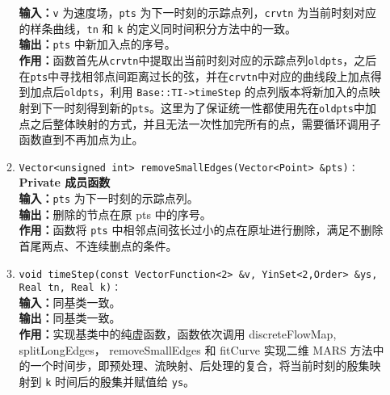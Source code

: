 \documentclass[a4paper,twoside]{ctexart}
\begin{document}
\begin{itemize}
\begin{enumerate}[(1)]
                \textbf{输入：}\texttt{v} 为速度场，\texttt{pts} 为下一时刻的示踪点列，\texttt{crvtn} 为当前时刻对应的样条曲线，\texttt{tn} 和 \texttt{k} 的定义同时间积分方法中的一致。\\
                \textbf{输出：}\texttt{pts} 中新加入点的序号。\\
                \textbf{作用：}函数首先从\texttt{crvtn}中提取出当前时刻对应的示踪点列\texttt{oldpts}，之后在\texttt{pts}中寻找相邻点间距离过长的弦，并在\texttt{crvtn}中对应的曲线段上加点得到加点后\texttt{oldpts}，利用 \texttt{Base::TI->timeStep} 的点列版本将新加入的点映射到下一时刻得到新的\texttt{pts}。这里为了保证统一性都使用先在\texttt{oldpts}中加点之后整体映射的方式，并且无法一次性加完所有的点，需要循环调用子函数直到不再加点为止。
                \item \texttt{Vector<unsigned int> removeSmallEdges(Vector<Point> \&pts)：}\\
                \textbf{Private 成员函数}\\
                \textbf{输入：}\texttt{pts} 为下一时刻的示踪点列。\\
                \textbf{输出：}删除的节点在原 pts 中的序号。\\
                \textbf{作用：}函数将 \texttt{pts} 中相邻点间弦长过小的点在原址进行删除，满足不删除首尾两点、不连续删点的条件。
                \item \texttt{void timeStep(const VectorFunction<2> \&v, YinSet<2,Order> \&ys, Real tn, Real k)：}\\
                \textbf{输入：}同基类一致。\\
                \textbf{输出：}同基类一致。\\
                \textbf{作用：}实现基类中的纯虚函数，函数依次调用 discreteFlowMap, splitLongEdges， removeSmallEdges 和 fitCurve 实现二维 MARS 方法中的一个时间步，即预处理、流映射、后处理的复合，将当前时刻的殷集映射到 \texttt{k} 时间后的殷集并赋值给 \texttt{ys}。
            \end{enumerate}
          \end{itemize}




\end{document}
